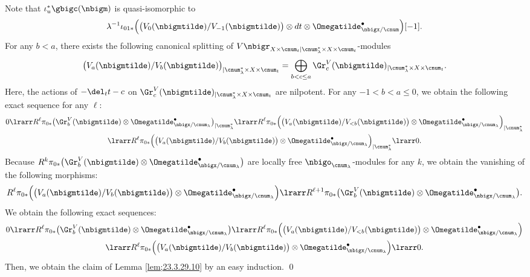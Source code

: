 \documentclass[a4,10pt]{article}
\begin{document}
Note that
$\iota_u^{\ast}\gbigc(\nbigm)$
is quasi-isomorphic to
\[
       \lambda^{-1}\iota_{01\ast}\Bigl(
       \bigl(V_0(\nbigmtilde)/V_{-1}(\nbigmtilde)\bigr)
       \otimes
       dt\otimes
       \Omegatilde^{\bullet}_{\nbigx/\cnum}
       \Bigr)[-1].
\]       
For any $b<a$,
there exists the following canonical splitting of
$V\nbigr_{X\times\cnum_t|
\cnum_{\lambda}^{\ast}\times X\times\cnum_t}$-modules
\begin{equation}
\label{eq;23.3.29.10}
\bigl(V_a(\nbigmtilde)/V_{b}(\nbigmtilde)\bigr)
_{|\cnum_{\lambda}^{\ast}\times X\times\cnum_t}
=\bigoplus_{b<c\leq a}
\Gr^V_c(\nbigmtilde)_{|\cnum_{\lambda}^{\ast}\times X\times \cnum_t}.
\end{equation}
Here, the actions of $-\del_tt-c$
on 
$\Gr^V_c(\nbigmtilde)_{|\cnum_{\lambda}^{\ast}\times X\times \cnum_t}$
are nilpotent.
For any $-1<b<a\leq 0$,
we obtain the following exact sequence for any $\ell$:
\begin{multline}
 0\lrarr
 R^{\ell}\pi_{0\ast}\bigl(
  \Gr^V_b(\nbigmtilde)
  \otimes\Omegatilde^{\bullet}_{\nbigx/\cnum_{\lambda}}
  \bigr)
 _{|\cnum_{\lambda}^{\ast}}
\lrarr
 R^{\ell}\pi_{0\ast}\Bigl(
 \bigl(V_a(\nbigmtilde)/V_{<b}(\nbigmtilde)\bigr)
  \otimes\Omegatilde^{\bullet}_{\nbigx/\cnum_{\lambda}}
    \Bigr)
 _{|\cnum_{\lambda}^{\ast}}
 \\
  \lrarr
   R^{\ell}\pi_{0\ast}\Bigl(
   \bigl(V_a(\nbigmtilde)/V_{b}(\nbigmtilde)\bigr)
     \otimes\Omegatilde^{\bullet}_{\nbigx/\cnum_{\lambda}}
   \Bigr)
  _{|\cnum_{\lambda}^{\ast}}
  \lrarr 0.
\end{multline}
Because 
$R^{k}\pi_{0\ast}\bigl(
\Gr^V_b(\nbigmtilde)
\otimes\Omegatilde^{\bullet}_{\nbigx/\cnum_{\lambda}}
\bigr)$
are locally free $\nbigo_{\cnum_{\lambda}}$-modules
for any $k$,
we obtain the vanishing of the following morphisms:
\[
   R^{\ell}\pi_{0\ast}\Bigl(
   \bigl(V_a(\nbigmtilde)/V_{b}(\nbigmtilde)\bigr)
     \otimes\Omegatilde^{\bullet}_{\nbigx/\cnum_{\lambda}}
   \Bigr)
   \lrarr
    R^{\ell+1}\pi_{0\ast}\bigl(
  \Gr^V_b(\nbigmtilde)
  \otimes\Omegatilde^{\bullet}_{\nbigx/\cnum_{\lambda}}
  \bigr).
\]
We obtain the following exact sequences:
 \begin{multline}
 0\lrarr
 R^{\ell}\pi_{0\ast}\bigl(
  \Gr^V_b(\nbigmtilde)
  \otimes\Omegatilde^{\bullet}_{\nbigx/\cnum_{\lambda}}
  \bigr)
\lrarr
 R^{\ell}\pi_{0\ast}\Bigl(
 \bigl(V_a(\nbigmtilde)/V_{<b}(\nbigmtilde)\bigr)
  \otimes\Omegatilde^{\bullet}_{\nbigx/\cnum_{\lambda}}
    \Bigr)
 \\
  \lrarr
   R^{\ell}\pi_{0\ast}\Bigl(
   \bigl(V_a(\nbigmtilde)/V_{b}(\nbigmtilde)\bigr)
     \otimes\Omegatilde^{\bullet}_{\nbigx/\cnum_{\lambda}}
   \Bigr)
  \lrarr 0.
  \end{multline}  
Then, we obtain the claim of Lemma \ref{lem;23.3.29.10}
by an easy induction.
\hfill\qed
\end{document}
